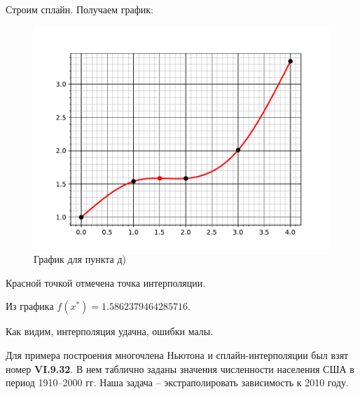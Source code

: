 \begin{enumerate}
			Строим сплайн. Получаем график:
			\begin{figure}[h!]
				\centering
				\includegraphics[width=\linewidth]{Pictures/5}
				\caption{График для пункта д)}
			\end{figure}
			
			Красной точкой отмечена точка интерполяции. 
			
			Из графика $f(x^*) = 1.5862379464285716$.
		\end{enumerate}
	
		Как видим, интерполяция удачна, ошибки малы.
		
		\newpage
		Для примера построения многочлена Ньютона и сплайн-интерполяции был взят номер \textbf{VI.9.32}. В нем таблично заданы значения численности населения США в период 1910--2000 гг. Наша задача -- экстраполировать зависимость к 2010 году.
		
